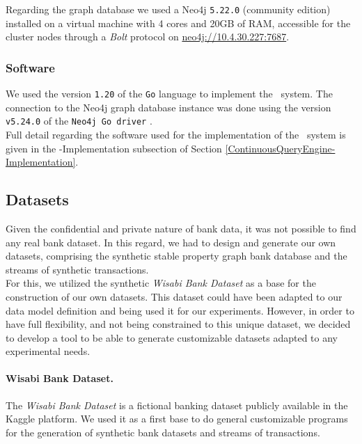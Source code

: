 Regarding the graph database we used a Neo4j \texttt{5.22.0} (community edition) installed on a virtual machine with 4 cores and 20GB of RAM, 
accessible for the cluster nodes through a \emph{Bolt} protocol on \url{neo4j://10.4.30.227:7687}. 

\subsubsection{Software}

We used the version \texttt{1.20} of the \texttt{Go} language to implement the \DPATM\ system. 
The connection to the Neo4j graph database instance was done using the version \texttt{v5.24.0} of the \texttt{Neo4j Go driver} \cite{neo4j-go-driver-v5240}.\\

Full detail regarding the software used for the implementation of the \DPATM\ system is given in the 
\DPATM-Implementation subsection of Section \ref{ContinuousQueryEngine-Implementation}.


\subsection{Datasets}\label{exps:datasets}

Given the confidential and private nature of bank data, it was not possible to find any real bank dataset. 
In this regard, we had to design and generate our own datasets, comprising the synthetic 
stable property graph bank database and the streams of synthetic transactions.\\

For this, we utilized the synthetic \emph{Wisabi Bank Dataset} \cite{wisabi-bank-dataset} as a base for the construction of our own datasets. 
This dataset could have been adapted to our data model definition and being used it for our experiments. 
However, in order to have full flexibility, and not being constrained to this unique dataset, 
we decided to develop a tool to be able to generate customizable datasets adapted to any experimental needs.\\

\paragraph*{Wisabi Bank Dataset.} The \emph{Wisabi Bank Dataset} is a fictional banking dataset publicly available in the Kaggle platform. 
We used it as a first base to do general customizable programs for the generation of synthetic bank datasets and streams of transactions.\\

